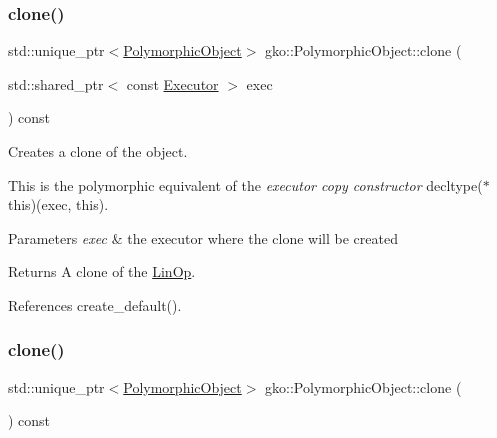 \subsubsection{\texorpdfstring{clone()}{clone()}\hspace{0.1cm}{\footnotesize\ttfamily [1/2]}}
{\footnotesize\ttfamily std\+::unique\+\_\+ptr$<$\hyperlink{classgko_1_1PolymorphicObject}{Polymorphic\+Object}$>$ gko\+::\+Polymorphic\+Object\+::clone (\begin{DoxyParamCaption}\item[{std\+::shared\+\_\+ptr$<$ const \hyperlink{classgko_1_1Executor}{Executor} $>$}]{exec }\end{DoxyParamCaption}) const\hspace{0.3cm}{\ttfamily [inline]}}



Creates a clone of the object. 

This is the polymorphic equivalent of the {\itshape executor copy constructor} {\ttfamily decltype($\ast$this)(exec, this)}.


\begin{DoxyParams}{Parameters}
{\em exec} & the executor where the clone will be created\\
\hline
\end{DoxyParams}
\begin{DoxyReturn}{Returns}
A clone of the \hyperlink{classgko_1_1LinOp}{Lin\+Op}. 
\end{DoxyReturn}


References create\+\_\+default().

\mbox{\label{classgko_1_1PolymorphicObject_a298c488bcb1906877a3584d88713ba81}} 
\subsubsection{\texorpdfstring{clone()}{clone()}\hspace{0.1cm}{\footnotesize\ttfamily [2/2]}}
{\footnotesize\ttfamily std\+::unique\+\_\+ptr$<$\hyperlink{classgko_1_1PolymorphicObject}{Polymorphic\+Object}$>$ gko\+::\+Polymorphic\+Object\+::clone (\begin{DoxyParamCaption}{ }\end{DoxyParamCaption}) const\hspace{0.3cm}{\ttfamily [inline]}}




